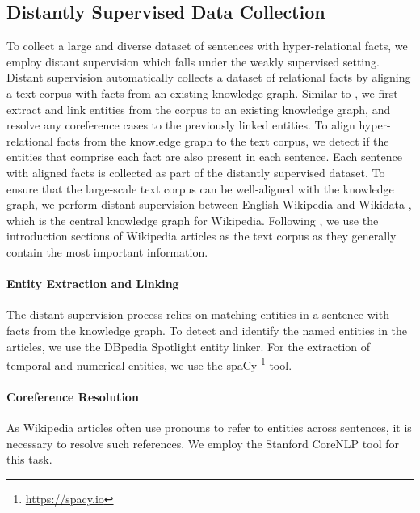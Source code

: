 \documentclass[11pt]{article}
\begin{document}
\subsection{Distantly Supervised Data Collection}
\label{sec:distant}
To collect a large and diverse dataset of sentences with hyper-relational facts, we employ distant supervision which falls under the weakly supervised setting.
Distant supervision automatically collects a dataset of relational facts by aligning a text corpus with facts from an existing knowledge graph.
Similar to \citet{elsahar-etal-2018-rex}, we first extract and link entities from the corpus to an existing knowledge graph, and resolve any coreference cases to the previously linked entities. 
To align hyper-relational facts from the knowledge graph to the text corpus, we detect if the entities that comprise each fact are also present in each sentence.
Each sentence with aligned facts is collected as part of the distantly supervised dataset.
To ensure that the large-scale text corpus can be well-aligned with the knowledge graph, we perform distant supervision between English Wikipedia and Wikidata \citep{DBLP:conf/semweb/ErxlebenGKMV14}, which is the central knowledge graph for Wikipedia. 
Following \citet{elsahar-etal-2018-rex}, we use the introduction sections of Wikipedia articles as the text corpus as they generally contain the most important information.

\paragraph{Entity Extraction and Linking}
The distant supervision process relies on matching entities in a sentence with facts from the knowledge graph.
To detect and identify the named entities in the articles, we use the DBpedia Spotlight \citep{10.1145/2063518.2063519} entity linker.
For the extraction of temporal and numerical entities, we use the spaCy \footnote{\href{https://spacy.io}{https://spacy.io}} tool.

\paragraph{Coreference Resolution}
As Wikipedia articles often use pronouns to refer to entities across sentences, it is necessary to resolve such references.
We employ the Stanford CoreNLP tool \citep{manning-etal-2014-stanford} for this task.
\end{document}
